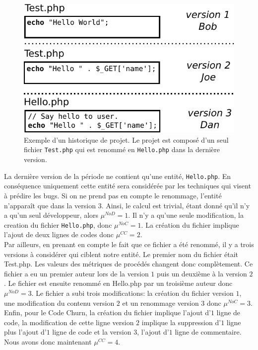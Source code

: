 \begin{figure}[t]
	\centering
	\includegraphics[width=0.8\linewidth,keepaspectratio]{data/figures/example.pdf}
	\caption{Exemple d'un historique de projet. Le projet est composé d'un seul fichier \texttt{Test.php} qui est renommé en \texttt{Hello.php} dans la dernière version.}
	\label{fig:example}
\end{figure}

La dernière version de la période ne contient qu'une entité, \texttt{Hello.php}. En conséquence uniquement cette entité sera considérée par les techniques qui visent à prédire les bugs. Si on ne prend pas en compte le renommage, l'entité n'apparaît que dans la version 3. Ainsi, le calcul est trivial, étant donné qu'il n'y a qu'un seul développeur, alors $\mu^{NoD}=1$. Il n'y a qu'une seule modification, la creation du fichier \texttt{Hello.php}, donc $\mu^{NoC}=1$. La création du fichier implique l'ajout de deux lignes de codes donc $\mu^{CC}=2$.\\

Par ailleurs, en prenant en compte le fait que ce fichier a été renommé, il y a trois versions à considérer qui ciblent notre entité. Le premier nom du fichier était Test.php. Les valeurs des métriques de procédés changent donc complètement. Ce fichier a eu un premier auteur lors de la version $1$ puis un deuxième à la version $2$. Le fichier est ensuite renommé en Hello.php par un troisième auteur donc $\mu^{NoD}=3$. Le fichier a subi trois modifications: la création du fichier version $1$, une modification du contenu version $2$ et un renommage version $3$ donc $\mu^{NoC}=3$. Enfin, pour le Code Churn, la création du fichier implique l'ajout d'$1$ ligne de code, la modification de cette ligne version $2$ implique la suppression d'$1$ ligne plus l'ajout d'$1$ ligne de code et la version 3, l'ajout d'$1$ ligne de commentaire. Nous avons donc maintenant $\mu^{CC}=4$. \\

